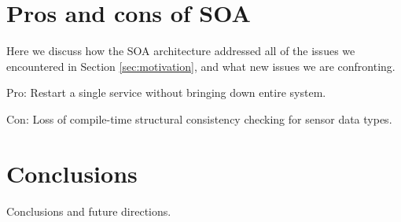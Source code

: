 \documentclass[conference,compsoc,peerreview]{IEEEtran}
\begin{document}
\section{Pros and cons of SOA}
\label{sec:discussion}

Here we discuss how the SOA architecture addressed all of the issues we encountered in Section \ref{sec:motivation}, and what new issues we are confronting. 

Pro: Restart a single service without bringing down entire system.

Con: Loss of compile-time structural consistency checking for sensor data types.

\section{Conclusions}
\label{sec:conclusion}

Conclusions and future directions. 




\end{document}
